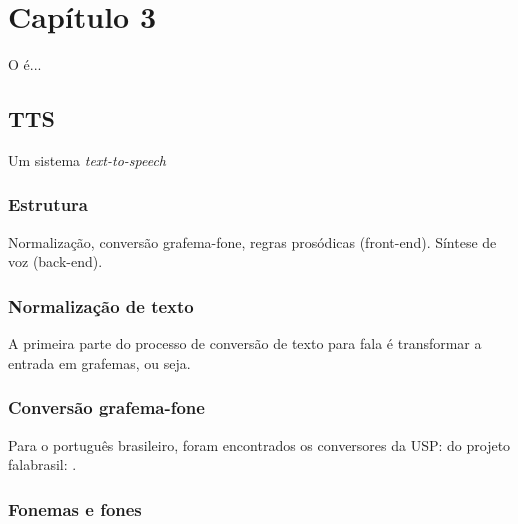
\chapter{Capítulo 3}

O  é...



\section{TTS}
Um sistema \emph{text-to-speech}
\subsection{Estrutura}
Normalização, conversão grafema-fone, regras prosódicas (front-end).
Síntese de voz (back-end).
\subsection{Normalização de texto}
A primeira parte do processo de conversão de texto para fala é transformar a entrada em grafemas, ou seja.
\subsection{Conversão grafema-fone}
Para o português brasileiro, foram encontrados os conversores
da USP: \cite{g2pusp}
do projeto falabrasil: \cite{falabrasil}.
\subsection{Fonemas e fones}
